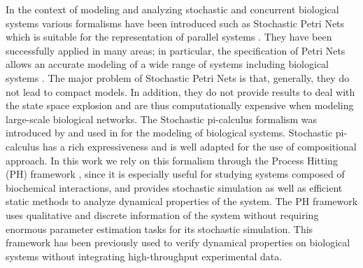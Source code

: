 


In the context of modeling and analyzing stochastic and concurrent biological systems various formalisms have been introduced such as 
Stochastic Petri Nets which is suitable for the representation of parallel systems \cite{molloy1982performance}. 
They have been successfully applied in many areas; in particular, the specification of Petri Nets
allows an accurate modeling of a wide range of systems including biological systems \cite{heiner2008petri}. The major 
problem of Stochastic Petri Nets is that, generally, they do not lead to compact models. In addition,
they do not provide results to deal with the state space explosion and are thus computationally
expensive when modeling large-scale biological networks. 
The Stochastic pi-calculus formalism was introduced by \cite{priami1995stochastic} and used in 
\cite{maurin2009modeling} for the modeling of biological systems. Stochastic pi-calculus has a rich
expressiveness and is well adapted for the use of compositional approach.
In this work we rely on this formalism through the Process Hitting (PH) framework \cite{PMR10-TCSB}, 
since it is especially useful for studying systems composed of biochemical interactions, and provides
stochastic simulation as well as efficient static methods to analyze dynamical properties of the system.
The PH framework uses qualitative and discrete information of the system without requiring enormous parameter estimation tasks
 for its stochastic simulation. 
This framework has been previously used to verify dynamical properties on biological systems without integrating high-throughput experimental data.

